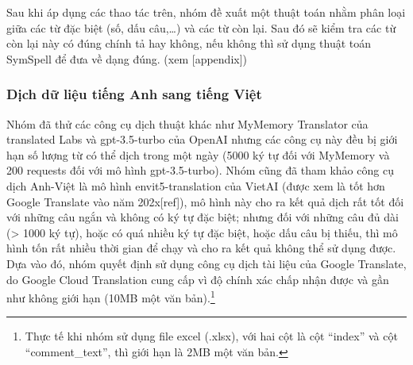 Sau khi áp dụng các thao tác trên, nhóm đề xuất một thuật toán nhằm phân loại giữa các từ đặc biệt (số, dấu câu,\dots) và các từ còn lại. Sau đó sẽ kiểm tra các từ còn lại này có đúng chính tả hay không, nếu không thì sử dụng thuật toán SymSpell để đưa về dạng đúng. (xem [appendix])

\subsubsection{Dịch dữ liệu tiếng Anh sang tiếng Việt}
Nhóm đã thử các công cụ dịch thuật khác như MyMemory Translator của translated Labs và gpt-3.5-turbo của OpenAI nhưng các công cụ này đều bị giới hạn số lượng từ có thể dịch trong một ngày (5000 ký tự đối với MyMemory và 200 requests đối với mô hình gpt-3.5-turbo). Nhóm cũng đã tham khảo công cụ dịch Anh-Việt là mô hình envit5-translation của VietAI (được xem là tốt hơn Google Translate vào năm 202x[ref]), mô hình này cho ra kết quả dịch rất tốt đối với những câu ngắn và không có ký tự đặc biệt; nhưng đối với những câu đủ dài (> 1000 ký tự), hoặc có quá nhiều ký tự đặc biệt, hoặc dấu câu bị thiếu, thì mô hình tốn rất nhiều thời gian để chạy và cho ra kết quả không thể sử dụng được. Dựa vào đó, nhóm quyết định sử dụng công cụ dịch tài liệu của Google Translate, do Google Cloud Translation cung cấp vì độ chính xác chấp nhận được và gần như không giới hạn (10MB một văn bản).\footnote{Thực tế khi nhóm sử dụng file excel (.xlsx), với hai cột là cột ``index'' và cột ``comment\_text'', thì giới hạn là 2MB một văn bản.}

